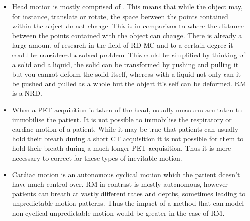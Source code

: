         \begin{itemize}
            \item Head motion is mostly comprised of . This means that while the object may, for instance, translate or rotate, the space between the points contained within the object do not change. This is in comparison to  where the distance between the points contained with the object can change. There is already a large amount of research in the field of \gls{RD} \gls{MC} and to a certain degree it could be considered a solved problem. This could be simplified by thinking of a solid and a liquid, the solid can be transformed by pushing and pulling it but you cannot deform the solid itself, whereas with a liquid not only can it be pushed and pulled as a whole but the object it's self can be deformed. \gls{RM} is a \gls{NRD}.
                
            \item When a \gls{PET} acquisition is taken of the head, usually measures are taken to immobilise the patient. It is not possible to immobilise the respiratory or cardiac motion of a patient. While it may be true that patients can usually hold their breath during a short \gls{CT} acquisition it is not possible for them to hold their breath during a much longer \gls{PET} acquisition. Thus it is more necessary to correct for these types of inevitable motion.
    
            \item Cardiac motion is an autonomous cyclical motion which the patient doesn't have much control over. \gls{RM} in contrast is mostly autonomous, however patients can breath at vastly different rates and depths, sometimes leading to unpredictable motion patterns. %
            Thus the impact of a method that can model non-cyclical unpredictable motion would be greater in the case of \gls{RM}.
        \end{itemize}
    
